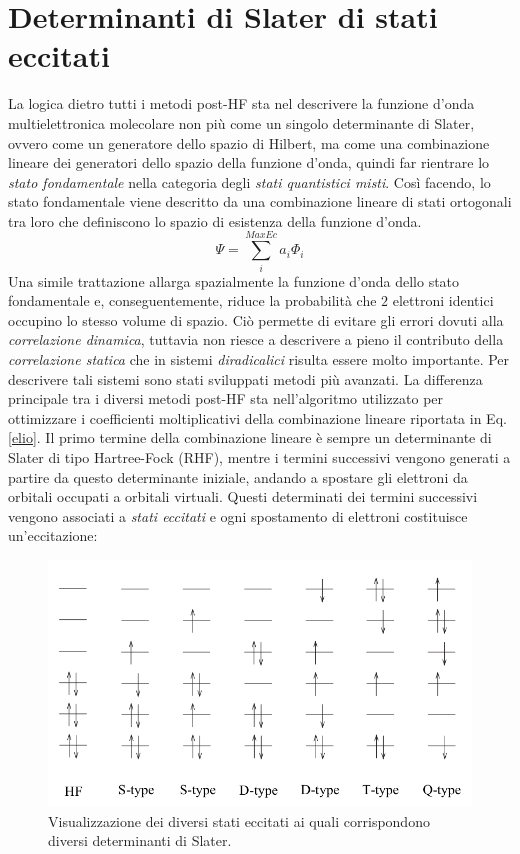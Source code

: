 \documentclass[oneside]{amsbook}
\numberwithin{section}{chapter}
\numberwithin{equation}{section}
\numberwithin{figure}{section}
\begin{document}
\section{Determinanti di Slater di stati eccitati}
La logica dietro tutti i metodi post-HF sta nel descrivere la funzione d'onda multielettronica molecolare non più come un singolo determinante di Slater, ovvero come un generatore dello spazio di Hilbert, ma come una combinazione lineare dei generatori dello spazio della funzione d'onda, quindi far rientrare lo \emph{stato fondamentale} nella categoria degli \emph{stati quantistici misti}. Così facendo, lo stato fondamentale viene descritto da una combinazione lineare di stati ortogonali tra loro che definiscono lo spazio di esistenza della funzione d'onda.
\begin{equation}
\label{elio}
\Psi=\sum \limits _i ^{MaxEc} a_i \Phi_i
\end{equation}
 Una simile trattazione allarga spazialmente la funzione d'onda dello stato fondamentale  e, conseguentemente, riduce la probabilità che $2$ elettroni identici occupino lo stesso volume di spazio. Ciò permette di evitare gli errori dovuti alla \emph{correlazione dinamica}, tuttavia non riesce a descrivere a pieno il contributo della \emph{correlazione statica } che in sistemi \emph{diradicalici} risulta essere molto importante. Per descrivere tali sistemi sono stati sviluppati metodi più avanzati.
 La differenza principale tra i diversi metodi post-HF sta nell'algoritmo utilizzato per ottimizzare i coefficienti moltiplicativi della combinazione lineare riportata in Eq.\ref{elio}.
Il primo termine della combinazione lineare è sempre un determinante di Slater di tipo Hartree-Fock (RHF), mentre i termini successivi vengono generati a partire da questo determinante iniziale, andando a spostare gli elettroni da orbitali occupati a orbitali virtuali. Questi determinati dei termini successivi vengono associati a \emph{stati eccitati} e ogni spostamento di elettroni costituisce un'eccitazione:

\begin{figure}[H]
\centering
\caption{Visualizzazione dei diversi stati eccitati ai quali corrispondono diversi determinanti di Slater.}\label{E}
\includegraphics[scale=0.3]{exx}
\end{figure}
\end{document}
